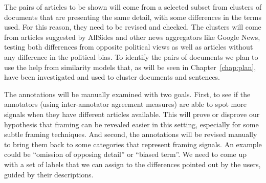 The pairs of articles to be shown will come from a selected subset from clusters of documents that are presenting the same detail, with some differences in the terms used. For this reason, they need to be revised and checked.
The clusters will come from articles suggested by AllSides and other news aggregators like Google News, testing both differences from opposite political views as well as articles without any difference in the political bias.
To identify the pairs of documents we plan to use the help from similarity models that, as will be seen in Chapter~\ref{chap:plan}, have been investigated and used to cluster documents and sentences.





The annotations will be manually examined with two goals.
First, to see if the annotators (using inter-annotator agreement measures) are able to spot more signals when they have different articles available.
This will prove or disprove our hypothesis that framing can be revealed easier in this setting, especially for some subtle framing techniques.
And second, the annotations will be revised manually to bring them back to some categories that represent framing signals. An example could be ``omission of opposing detail'' or ``biased term''. We need to come up with a set of labels that we can assign to the differences pointed out by the users, guided by their descriptions.



